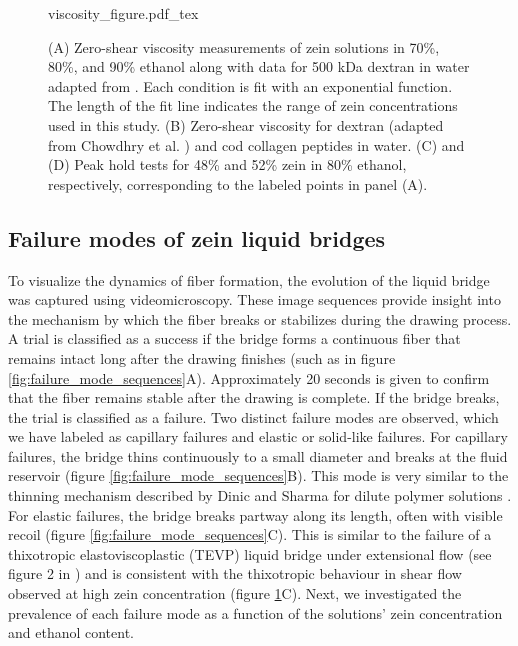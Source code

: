\documentclass[lineno]{JFM-FLM_Au}
\begin{document}
\begin{figure}[tbp]
  \centering
  \def\svgwidth{0.6\textwidth} %
  {viscosity_figure.pdf_tex}
	\caption{
		(A) Zero-shear viscosity measurements of zein solutions in 70\%, 80\%, and 90\% ethanol along with data for 500 kDa dextran in water adapted from \cite{chowdhry_polymer_2021}.
		Each condition is fit with an exponential function.
		The length of the fit line indicates the range of zein concentrations used in this study.
		(B) Zero-shear viscosity for dextran (adapted from Chowdhry et al. \cite{chowdhry_polymer_2021}) and cod collagen peptides in water.
		(C) and (D) Peak hold tests for 48\% and 52\% zein in 80\% ethanol, respectively, corresponding to the labeled points in panel (A).
	}
	\label{fig:flow_sweep_example}
\end{figure}


\subsection{Failure modes of zein liquid bridges}
To visualize the dynamics of fiber formation, the evolution of the liquid bridge was captured using videomicroscopy. These image sequences provide insight into the mechanism by which the fiber breaks or stabilizes during the drawing process. A trial is classified as a success if the bridge forms a continuous fiber that remains intact long after the drawing finishes (such as in figure \ref{fig:failure_mode_sequences}A). Approximately 20 seconds is given to confirm that the fiber remains stable after the drawing is complete. If the bridge breaks, the trial is classified as a failure. Two distinct failure modes are observed, which we have labeled as capillary failures and elastic or solid-like failures. For capillary failures, the bridge thins continuously to a small diameter and breaks at the fluid reservoir (figure \ref{fig:failure_mode_sequences}B). This mode is very similar to the thinning mechanism described by Dinic and Sharma for dilute polymer solutions \cite{dinic_macromolecular_2019}. For elastic failures, the bridge breaks partway along its length, often with visible recoil (figure \ref{fig:failure_mode_sequences}C). This is similar to the failure of a thixotropic elastoviscoplastic (TEVP) liquid bridge under extensional flow (see figure 2 in \cite{chan_edge_2023}) and is consistent with the thixotropic behaviour in shear flow observed at high zein concentration (figure \ref{fig:flow_sweep_example}C). Next, we investigated the prevalence of each failure mode as a function of the solutions' zein concentration and ethanol content.
\end{document}
